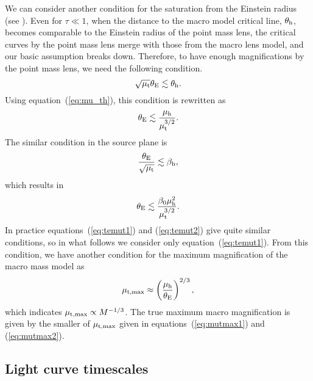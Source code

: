 \documentclass[showpacs,twocolumn,preprintnumbers,amsmath,amssymb,superscriptaddress,nofootinbib]{revtex4}
\begin{document}
We can consider another condition for the saturation from the Einstein
radius (see \cite{Venumadhav:2017pps}). Even for $\tau\ll1$, when the
distance to the macro model critical line, $\theta_{\rm h}$, becomes
comparable to the Einstein radius of the point mass lens, the critical
curves by the point mass lens merge with those from the macro lens
model, and our basic assumption breaks down. Therefore, to have enough
magnifications by the point mass lens, we need the following
condition.
\begin{equation}
\sqrt{\mu_{\rm t}}\theta_{\rm E}\lesssim \theta_{\rm h}.
\end{equation}
Using equation~(\ref{eq:mu_th}), this condition is rewritten as
\begin{equation}
\theta_{\rm E}\lesssim \frac{\mu_{\rm h}}{\mu_{\rm t}^{3/2}}.
\label{eq:temut1} 
\end{equation}
The similar condition in the source plane is
\begin{equation}
\frac{\theta_{\rm E}}{\sqrt{\mu_{\rm t}}}\lesssim \beta_{\rm h},
\end{equation}
which results in
\begin{equation}
\theta_{\rm E}\lesssim \frac{\beta_0\mu_{\rm h}^2}{\mu_{\rm t}^{3/2}}.
\label{eq:temut2} 
\end{equation}
In practice equations~(\ref{eq:temut1}) and (\ref{eq:temut2}) give
quite similar conditions, so in what follows we consider only
equation~(\ref{eq:temut1}). From this condition, we have another
condition for the maximum magnification of the macro mass model
as
\begin{equation}
\mu_{\rm t,max}\approx \left(\frac{\mu_{\rm h}}{\theta_{\rm E}}\right)^{2/3},
\label{eq:mutmax2}
\end{equation}
which indicates $\mu_{\rm t,max} \propto M^{-1/3}$. The true maximum
macro magnification is given by the smaller of $\mu_{\rm t,max}$ given
in equations~(\ref{eq:mutmax1}) and (\ref{eq:mutmax2}).

\subsection{Light curve timescales}
\end{document}
